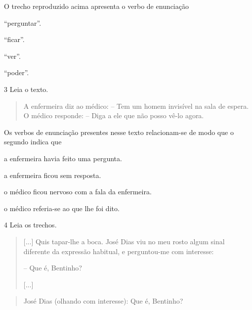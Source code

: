 O trecho reproduzido acima apresenta o verbo de enunciação

\begin{escolha}
\item “perguntar”.

\item “ficar”.

\item “ver”.

\item “poder”.
\end{escolha}


\pagebreak
\num{3} Leia o texto.

\begin{quote}
A enfermeira diz ao médico:
– Tem um homem invisível na sala de espera.
O médico responde:
– Diga a ele que não posso vê-lo agora.

\end{quote}

Os verbos de enunciação presentes nesse texto relacionam-se de modo que o segundo indica que

\begin{escolha}
\item a enfermeira havia feito uma pergunta.

\item a enfermeira ficou sem resposta.

\item o médico ficou nervoso com a fala da enfermeira.

\item o médico referia-se ao que lhe foi dito.
\end{escolha}



\num{4} Leia os trechos.

\begin{quote}
{[}...{]} Quis tapar-lhe a boca. José Dias viu no meu rosto algum
sinal diferente da expressão habitual, e perguntou-me com interesse:

– Que é, Bentinho?

{[}...{]}

\end{quote}


\begin{quote}
José Dias (olhando com interesse): Que é, Bentinho?

\end{quote}

